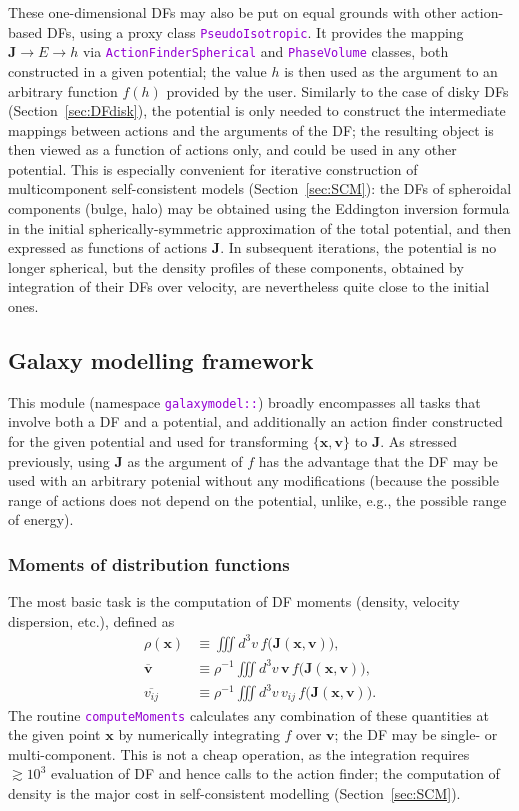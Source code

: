 \documentclass[12pt]{article}
\newcommand{\ttt}[1]{\textcolor{darkviolet}{\texttt{#1}}}
\newcommand{\bv}{\boldsymbol{v}}
\newcommand{\bx}{\boldsymbol{x}}
\newcommand{\bJ}{\boldsymbol{J}}
\begin{document}
These one-dimensional DFs may also be put on equal grounds with other action-based DFs, using a proxy class \ttt{PseudoIsotropic}. It provides the mapping $\bJ \to E \to h$ via \ttt{ActionFinderSpherical} and \ttt{PhaseVolume} classes, both constructed in a given potential; the value $h$ is then used as the argument to an arbitrary function $f(h)$ provided by the user. Similarly to the case of disky DFs (Section~\ref{sec:DFdisk}), the potential is only needed to construct the intermediate mappings between actions and the arguments of the DF; the resulting object is then viewed as a function of actions only, and could be used in any other potential.
This is especially convenient for iterative construction of multicomponent self-consistent models (Section~\ref{sec:SCM}): the DFs of spheroidal components (bulge, halo) may be obtained using the Eddington inversion formula in the initial spherically-symmetric approximation of the total potential, and then expressed as functions of actions $\bJ$. In subsequent iterations, the potential is no longer spherical, but the density profiles of these components, obtained by integration of their DFs over velocity, are nevertheless quite close to the initial ones.

\subsection{Galaxy modelling framework}  \label{sec:GalaxyModel}

This module (namespace \ttt{galaxymodel::}) broadly encompasses all tasks that involve both a DF and a potential, and additionally an action finder constructed for the given potential and used for transforming $\{\bx,\bv\}$ to $\bJ$.
As stressed previously, using $\bJ$ as the argument of $f$ has the advantage that the DF may be used with an arbitrary potenial without any modifications (because the possible range of actions does not depend on the potential, unlike, e.g., the possible range of energy).

\subsubsection{Moments of distribution functions}  \label{sec:Moments}

The most basic task is the computation of DF moments (density, velocity dispersion, etc.), defined as
\begin{align*}
\rho(\bx) &\equiv \iiint d^3v\, f\big(\bJ(\bx,\bv)\big), \\
\overline{\bv} &\equiv \rho^{-1} \iiint d^3v \,\bv\, f\big(\bJ(\bx,\bv)\big), \\
\overline{v_{ij}} &\equiv \rho^{-1} \iiint d^3v \,v_{ij}\, f\big(\bJ(\bx,\bv)\big).
\end{align*}
The routine \ttt{computeMoments} calculates any combination of these quantities at the given point $\bx$ by numerically integrating $f$ over $\bv$; the DF may be single- or multi-component. 
This is not a cheap operation, as the integration requires $\gtrsim 10^3$ evaluation of DF and hence calls to the action finder; the computation of density is the major cost in self-consistent modelling (Section~\ref{sec:SCM}).
\end{document}
